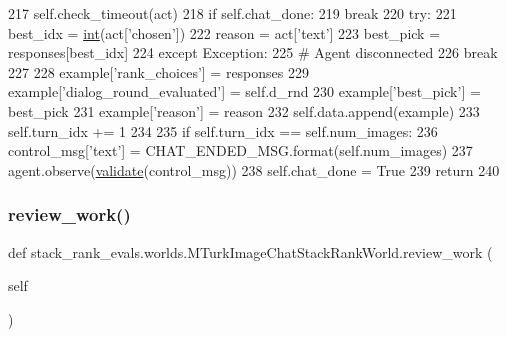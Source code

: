 \begin{DoxyCode}
217             self.check\_timeout(act)
218             \textcolor{keywordflow}{if} self.chat\_done:
219                 \textcolor{keywordflow}{break}
220             \textcolor{keywordflow}{try}:
221                 best\_idx = \hyperlink{namespacelanguage__model_1_1eval__ppl_a7d12ee00479673c5c8d1f6d01faa272a}{int}(act[\textcolor{stringliteral}{'chosen'}])
222                 reason = act[\textcolor{stringliteral}{'text'}]
223                 best\_pick = responses[best\_idx]
224             \textcolor{keywordflow}{except} Exception:
225                 \textcolor{comment}{# Agent disconnected}
226                 \textcolor{keywordflow}{break}
227 
228             example[\textcolor{stringliteral}{'rank\_choices'}] = responses
229             example[\textcolor{stringliteral}{'dialog\_round\_evaluated'}] = self.d\_rnd
230             example[\textcolor{stringliteral}{'best\_pick'}] = best\_pick
231             example[\textcolor{stringliteral}{'reason'}] = reason
232             self.data.append(example)
233             self.turn\_idx += 1
234 
235         \textcolor{keywordflow}{if} self.turn\_idx == self.num\_images:
236             control\_msg[\textcolor{stringliteral}{'text'}] = CHAT\_ENDED\_MSG.format(self.num\_images)
237             agent.observe(\hyperlink{namespaceparlai_1_1core_1_1worlds_afc3fad603b7bce41dbdc9cdc04a9c794}{validate}(control\_msg))
238         self.chat\_done = \textcolor{keyword}{True}
239         \textcolor{keywordflow}{return}
240 
\end{DoxyCode}
\mbox{\label{classstack__rank__evals_1_1worlds_1_1MTurkImageChatStackRankWorld_a47f6f4ec8f01b20228f9ed3c4cc4726f}} 
\subsubsection{\texorpdfstring{review\+\_\+work()}{review\_work()}}
{\footnotesize\ttfamily def stack\+\_\+rank\+\_\+evals.\+worlds.\+M\+Turk\+Image\+Chat\+Stack\+Rank\+World.\+review\+\_\+work (\begin{DoxyParamCaption}\item[{}]{self }\end{DoxyParamCaption})}




